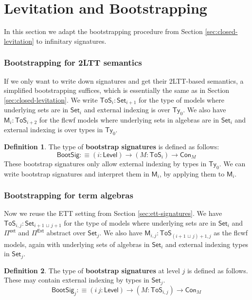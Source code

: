 \documentclass[12pt,a4paper,twoside,openany]{book}
\theoremstyle{remark}
\theoremstyle{definition}
\newtheorem{mydefinition}{Definition}
\theoremstyle{theorem}
\newcommand{\ms}[1]{\mathsf{#1}}
\newcommand{\bs}[1]{\boldsymbol{#1}}
\newcommand{\Con}{\mathsf{Con}}
\newcommand{\Ty}{\mathsf{Ty}}
\newcommand{\Set}{\mathsf{Set}}
\newcommand{\ToS}{\mathsf{ToS}}
\newcommand{\Pie}{\Pi^{\mathsf{Ext}}}
\newcommand{\Piinf}{\Pi^{\mathsf{ext}}}
\newcommand{\bM}{\bs{\mathsf{M}}}
\newcommand{\defn}{:\equiv}
\newcommand{\lub}{\,\sqcup\,}
\begin{document}
\section{Levitation and Bootstrapping}
\label{sec:iqii-levitation}

In this section we adapt the bootstrapping procedure from Section
\ref{sec:closed-levitation} to infinitary signatures.

\subsubsection{Bootstrapping for 2LTT semantics}

If we only want to write down signatures and get their 2LTT-based semantics, a
simplified bootstrapping suffices, which is essentially the same as in Section
\ref{sec:closed-levitation}. We write $\ToS_i : \Set_{i+1}$ for the type of
models where underlying sets are in $\Set_i$ and external indexing is over
$\Ty_0$.  We also have $\bM_{i} : \ToS_{i + 2}$ for the flcwf models where
underlying sets in algebras are in $\Set_i$ and external indexing is over types
in $\Ty_0$.

\begin{mydefinition} The type of \textbf{bootstrap signatures} is defined as follows:
\[
  \ms{BootSig} \defn (i : \ms{Level}) \to (M : \ToS_{i}) \to \Con_{M}
\]
These bootstrap signatures only allow external indexing by types in $\Ty_0$.  We
can write bootstrap signatures and interpret them in $\bM_i$, by applying them
to $\bM_i$.
\end{mydefinition}

\subsubsection{Bootstrapping for term algebras}

Now we reuse the ETT setting from Section \ref{sec:ett-signatures}. We have
$\ToS_{i,j} : \Set_{i+1\lub j+1}$ for the type of models where underlying sets
are in $\Set_i$ and $\Piinf$ and $\Pie$ abstract over $\Set_j$. We also have
$\bM_{i,j} : \ToS_{(i+1\lub j)+1,j}$ as the flcwf models, again with underlying
sets of algebras in $\Set_i$ and external indexing types in $\Set_j$.

\begin{mydefinition} The type of \textbf{bootstrap signatures} at level $j$ is defined as follows.
These may contain external indexing by types in $\Set_j$.
\[
  \ms{BootSig}_j \defn (i\,j : \ms{Level}) \to (M : \ToS_{i,j}) \to \Con_{M}
\]
\end{mydefinition}
\end{document}
